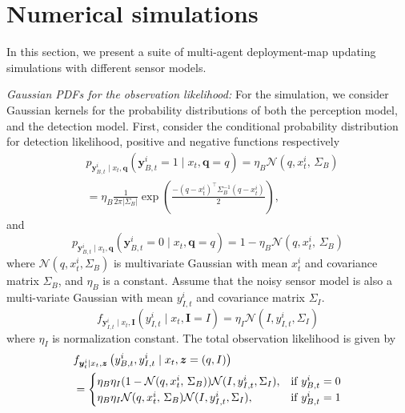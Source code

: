 \documentclass[journal]{IEEEtran}
\begin{document}




\section{Numerical simulations}
\label{sec:sec7}
In this section, we present a suite of multi-agent deployment-map updating simulations with different sensor models.


\textit{Gaussian PDFs for the observation likelihood:}
For the simulation, we consider Gaussian kernels for the probability distributions of both the perception model, and the detection model.
First, consider the conditional probability distribution for detection likelihood, positive and negative functions respectively
\begin{align*}
&p_{
	\bm{y}_{B,t}^i\mid
	x_t,\bm{q}
}(\bm{y}_{B,t}^i=1\mid x_t,\bm{q}=q)
=\eta_{B}\mathcal{N}(q,x_t^i,\,\Sigma_B) \\
& = \eta_{B}\frac{1}{2\pi\left|\Sigma_B\right|}
\exp\left(
\frac{-(q-x_t^i)^{\top}\Sigma_B^{-1}(q-x_t^i)}{2}
\right),
\end{align*}
and 
\[
p_{
	\bm{y}_{B,t}^i\mid
	x_t,\bm{q}
}(\bm{y}_{B,t}^i=0\mid x_t,\bm{q}=q)
=1-\eta_{B}\mathcal{N}(q,x_t^i,\,\Sigma_B)
\]
where $\mathcal{N}(q,x_t^i,\Sigma_B)$ is multivariate Gaussian with mean $x_t^i$ and covariance matrix $\Sigma_B$, and $\eta_{B}$ is a constant.
Assume that the noisy sensor model is also a multi-variate Gaussian with mean $y_{I,t}^i$ and covariance matrix $\Sigma_I$.
\[
f_{
	\bm{y}_{I,t}^i\mid
	x_t,\bm{I}
}(y_{I,t}^i\mid x_t,\bm{I}=I)
=
\eta_I \mathcal{N}(I,y_{I,t}^i,\Sigma_I)
\]
where $\eta_I$ is normalization constant. The total observation likelihood is given by
\begin{align*}
&f_{\bm{y}_t^i\mid x_t,\bm{z}}
\left(
y_{B,t}^i,y_{I,t}^i \mid x_t,\bm{z}=(q,I)
\right) \\
&=\begin{cases}
\eta_B\eta_I(1-\mathcal{N}(q,x_t^i,\,\Sigma_B))\mathcal{N}(I,y_{I,t}^i,\Sigma_I)
, &\textup{if }y_{B,t}^i = 0 \\
\eta_B\eta_I\mathcal{N}(q,x_t^i,\,\Sigma_B)
\mathcal{N}(I,y_{I,t}^i,\Sigma_I)
, &\textup{if }y_{B,t}^i = 1
\end{cases}
\end{align*}
\end{document}
